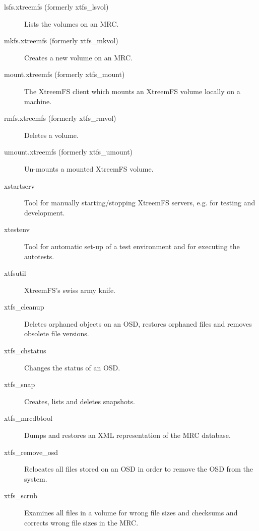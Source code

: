 \documentclass[a4paper,10pt]{book}
\begin{document}
\begin{description}
 \item[lsfs.xtreemfs (formerly xtfs\_lsvol)] Lists the volumes on an MRC.
 \item[mkfs.xtreemfs (formerly xtfs\_mkvol)] Creates a new volume on an MRC.
 \item[mount.xtreemfs (formerly xtfs\_mount)] The XtreemFS client which mounts an XtreemFS volume locally on a machine.
 \item[rmfs.xtreemfs (formerly xtfs\_rmvol)] Deletes a volume.
 \item[umount.xtreemfs (formerly xtfs\_umount)] Un-mounts a mounted XtreemFS volume.
 \item[xstartserv] Tool for manually starting/stopping XtreemFS servers, e.g. for testing and development.
 \item[xtestenv] Tool for automatic set-up of a test environment and for executing the autotests.
 \item[xtfsutil] XtreemFS's swiss army knife.
 \item[xtfs\_cleanup] Deletes orphaned objects on an OSD, restores orphaned files and removes obsolete file versions.
 \item[xtfs\_chstatus] Changes the status of an OSD.
 \item[xtfs\_snap] Creates, lists and deletes snapshots.
 \item[xtfs\_mrcdbtool] Dumps and restores an XML representation of the MRC database.
 \item[xtfs\_remove\_osd] Relocates all files stored on an OSD in order to remove the OSD from the system.
 \item[xtfs\_scrub] Examines all files in a volume for wrong file sizes and checksums and corrects wrong file sizes in the MRC.
\end{description}

\printindex
\end{document}
